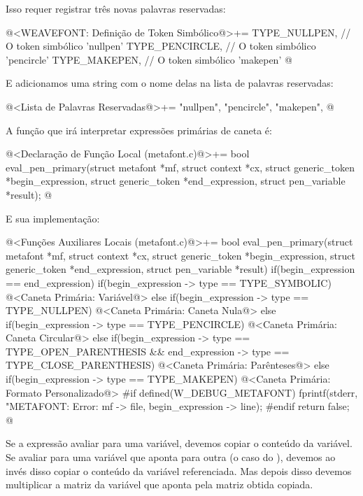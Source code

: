 {{{{{{Isso requer registrar três novas palavras reservadas:

\iniciocodigo
@<WEAVEFONT: Definição de Token Simbólico@>+=
TYPE_NULLPEN,        // O token simbólico 'nullpen'
TYPE_PENCIRCLE,      // O token simbólico 'pencircle'
TYPE_MAKEPEN,        // O token simbólico 'makepen'
@
\fimcodigo

E adicionamos uma string com o nome delas na lista de palavras
reservadas:

\iniciocodigo
@<Lista de Palavras Reservadas@>+=
"nullpen", "pencircle", "makepen",
@
\fimcodigo

A função que irá interpretar expressões primárias de caneta é:

\iniciocodigo
@<Declaração de Função Local (metafont.c)@>+=
bool eval_pen_primary(struct metafont *mf, struct context *cx,
                      struct generic_token *begin_expression,
                      struct generic_token *end_expression,
                      struct pen_variable *result);
@
\fimcodigo

E sua implementação:

\iniciocodigo
@<Funções Auxiliares Locais (metafont.c)@>+=
bool eval_pen_primary(struct metafont *mf, struct context *cx,
                      struct generic_token *begin_expression,
                      struct generic_token *end_expression,
                      struct pen_variable *result){
  if(begin_expression == end_expression){
    if(begin_expression -> type == TYPE_SYMBOLIC){
      @<Caneta Primária: Variável@>
    }
    else if(begin_expression -> type == TYPE_NULLPEN){
      @<Caneta Primária: Caneta Nula@>
    }
    else if(begin_expression -> type == TYPE_PENCIRCLE){
      @<Caneta Primária: Caneta Circular@>
    }
  }
  else{
    if(begin_expression -> type == TYPE_OPEN_PARENTHESIS &&
      end_expression -> type == TYPE_CLOSE_PARENTHESIS){
      @<Caneta Primária: Parênteses@>
    }
    else if(begin_expression -> type == TYPE_MAKEPEN){
      @<Caneta Primária: Formato Personalizado@>
    }
  }
#if defined(W_DEBUG_METAFONT)
  fprintf(stderr, "METAFONT: Error: %
          mf -> file, begin_expression -> line);
#endif
  return false;
}
@
\fimcodigo

Se a expressão avaliar para uma variável, devemos copiar o conteúdo da
variável. Se avaliar para uma variável que aponta para outra (o caso
do ), devemos ao invés disso copiar o conteúdo
da variável referenciada. Mas depois disso devemos multiplicar a
matriz da variável que aponta pela matriz obtida copiada.

}}}}}}
